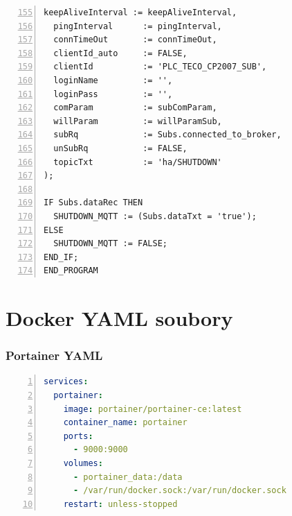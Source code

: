 \pagebreak
\begin{lstlisting}[language=ST, breaklines=true, numbers=left, firstnumber=155, numberstyle=\small, numbersep=10pt, frame=single, basicstyle=\ttfamily\small]
  keepAliveInterval := keepAliveInterval,
  pingInterval      := pingInterval,
  connTimeOut       := connTimeOut,
  clientId_auto     := FALSE,
  clientId          := 'PLC_TECO_CP2007_SUB',
  loginName         := '',
  loginPass         := '',
  comParam          := subComParam,
  willParam         := willParamSub,
  subRq             := Subs.connected_to_broker,
  unSubRq           := FALSE,
  topicTxt          := 'ha/SHUTDOWN'
);

IF Subs.dataRec THEN
  SHUTDOWN_MQTT := (Subs.dataTxt = 'true');
ELSE
  SHUTDOWN_MQTT := FALSE;
END_IF;
END_PROGRAM
\end{lstlisting}
\chapter{Docker YAML soubory}
\label{apend:dockeryaml}
\subsection{Portainer YAML}
\label{apend:portaineryaml}
\begin{lstlisting}[language=YAML, breaklines=true, numbers=left, numberstyle=\small, numbersep=10pt, frame=single, basicstyle=\ttfamily\small, caption={Portainer YAML}, label={lst:portaineryaml}]
services:
  portainer:
    image: portainer/portainer-ce:latest
    container_name: portainer
    ports:
      - 9000:9000
    volumes:
      - portainer_data:/data
      - /var/run/docker.sock:/var/run/docker.sock
    restart: unless-stopped
\end{lstlisting}
\pagebreak
